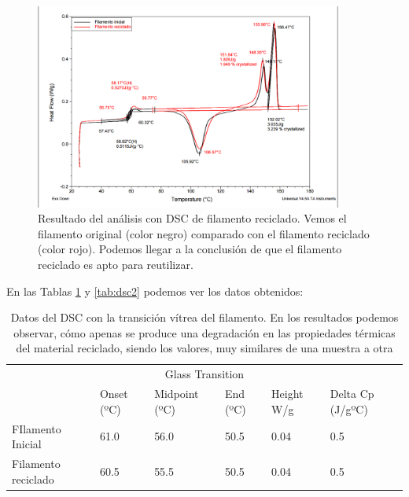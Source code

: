 \begin{figure}[H]
    \centering
    \includegraphics[width=0.9\textwidth]{images/dsc2.png}
    \caption[Resultado del análisis con DSC de filamento reciclado.]{Resultado del análisis con DSC de filamento reciclado. Vemos el filamento original (color negro) comparado con el filamento reciclado (color rojo). Podemos llegar a la conclusión de que el filamento reciclado es apto para reutilizar.}
    \label{fig:analisis_dsc}
\end{figure}

En las Tablas \ref{tab:dsc1} y \ref{tab:dsc2} podemos ver los datos obtenidos:

\begin{table}[H]
    \centering
    \begin{tabular}{llllll}
        \multicolumn{6}{c}{Glass Transition}                                                        \\
                            & Onset (ºC) & Midpoint (ºC) & End (ºC) & Height W/g & Delta Cp (J/gºC) \\ \hline
        FIlamento Inicial   & 61.0      & 56.0         & 50.5    & 0.04    & 0.5           \\
        Filamento reciclado & 60.5     & 55.5         & 50.5    & 0.04    & 0.5         
    \end{tabular}
    \caption[Datos del DSC con la transición vítrea del filamento.]{Datos del DSC con la transición vítrea del filamento. En los resultados podemos observar, cómo apenas se produce una degradación en las propiedades térmicas del material reciclado, siendo los valores, muy similares de una muestra a otra}
    \label{tab:dsc1}
\end{table} 

